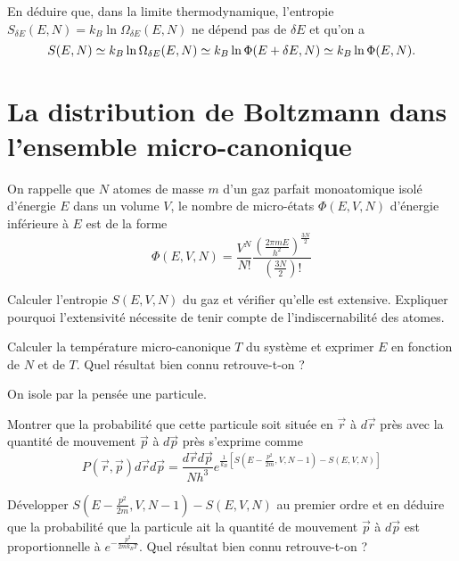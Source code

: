 \documentclass[utf8, 11pt]{feuille}
\begin{document}
\question
En déduire que, dans la limite thermodynamique, l'entropie $S_{\delta E}(E,N)=k_B \ln \Omega_{\delta E}(E,N)$ ne dépend pas de ${\delta E}$ et qu'on a
$$
S(E,N) \simeq k_B \ln \Omega_{\delta E}(E,N)\simeq k_B \ln \Phi(E+\delta E,N) \simeq k_B \ln \Phi(E,N). \nonumber \\
$$



\section{La distribution de Boltzmann dans l'ensemble micro-canonique}

On rappelle que $N$ atomes de masse $m$ d'un gaz parfait monoatomique isolé d'énergie $E$ dans un volume $V$, le nombre de micro-états $\Phi(E,V,N)$  d'énergie inférieure à $E$ est de la forme
$$
\Phi(E, V, N)= \frac{V^N}{N!}\frac{(\frac{2\pi m E}{h^2})^{\frac{3N}{2}}}{(\frac{3N}{2})!}
$$

\question
Calculer l'entropie $S(E,V,N)$ du gaz et vérifier qu'elle est extensive. Expliquer pourquoi l'extensivité nécessite de tenir compte de l'indiscernabilité des atomes.

\question
Calculer la température micro-canonique $T$ du système et exprimer $E$ en fonction de $N$ et de $T$. Quel résultat bien connu retrouve-t-on ?

On isole par la pensée une particule. 

\question
Montrer que la probabilité que cette particule soit située en $\vec r$ à $d\vec r$ près avec la quantité de mouvement $\vec p$ à $d\vec p$ près s'exprime comme
$$
P(\vec r,\vec p)d\vec r d\vec p=\frac{d\vec r d\vec p}{N h^3} e^{\frac{1}{k_B}\left[S(E-\frac{p^2}{2m},V,N-1)-S(E,V,N) \right]}
$$

\question
Développer $S(E-\frac{p^2}{2m},V,N-1)-S(E,V,N)$ au premier ordre et en déduire que la probabilité que la particule ait la quantité de mouvement $\vec p$ à $d\vec p$ est proportionnelle à $e^{-\frac{p^2}{2mk_BT}}$. Quel résultat bien connu retrouve-t-on ?
\end{document}
